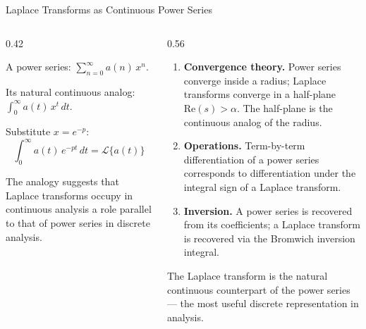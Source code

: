 \documentclass[aspectratio=169,11pt]{beamer}
\begin{document}
\begin{frame}{Laplace Transforms as Continuous Power Series}
\footnotesize
\begin{columns}[T]
\begin{column}{0.42\textwidth}
\begin{topicsbox}
A power series: $\displaystyle\sum_{n=0}^{\infty} a(n)\, x^n$.

Its natural continuous analog: $\displaystyle\int_0^{\infty} a(t)\, x^t\, dt$.

Substitute $x = e^{-p}$:
\[\int_0^{\infty} a(t)\, e^{-pt}\, dt = \mathcal{L}\{a(t)\}\]

\medskip
The analogy suggests that Laplace transforms occupy in continuous analysis a role parallel to that of power series in discrete analysis.
\end{topicsbox}
\end{column}
\begin{column}{0.56\textwidth}
\begin{methodbox}
\begin{enumerate}
\item \textbf{Convergence theory.} Power series converge inside a radius; Laplace transforms converge in a half-plane $\mathrm{Re}(s) > \alpha$. The half-plane is the continuous analog of the radius.
\item \textbf{Operations.} Term-by-term differentiation of a power series corresponds to differentiation under the integral sign of a Laplace transform.
\item \textbf{Inversion.} A power series is recovered from its coefficients; a Laplace transform is recovered via the Bromwich inversion integral.
\end{enumerate}
\end{methodbox}
\vspace{0.5mm}
\begin{conceptbox}
The Laplace transform is the natural continuous counterpart of the power series --- the most useful discrete representation in analysis.
\end{conceptbox}
\end{column}
\end{columns}
\end{frame}
\end{document}
